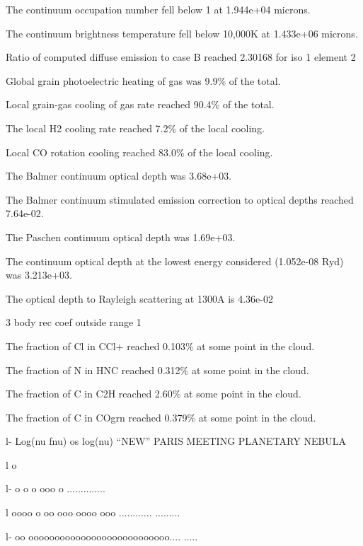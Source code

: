 {   The continuum occupation number fell below 1 at 1.944e+04 microns.

   The continuum brightness temperature fell below 10,000K at 1.433e+06
microns.

   Ratio of computed diffuse emission to case B reached 2.30168 for iso
1 element 2

   Global grain photoelectric heating of gas was  9.9\% of the total.

   Local grain-gas cooling of gas rate reached  90.4\% of the total.

   The local H2 cooling rate reached 7.2\% of the local cooling.

   Local CO rotation cooling reached 83.0\% of the local cooling.

   The Balmer continuum optical depth was  3.68e+03.

   The Balmer continuum stimulated emission correction to optical depths
reached  7.64e-02.

   The Paschen continuum optical depth was 1.69e+03.

   The continuum optical depth at the lowest energy considered (1.052e-08
Ryd) was  3.213e+03.

   The optical depth to Rayleigh scattering at 1300A is 4.36e-02

   3 body rec coef outside range 1

   The fraction of Cl in CCl+   reached 0.103\% at some point in the cloud.

   The fraction of N  in HNC    reached 0.312\% at some point in the cloud.

   The fraction of C  in C2H    reached 2.60\% at some point in the cloud.

   The fraction of C  in COgrn  reached 0.379\% at some point in the cloud.

 
    l-                      Log(nu fnu) os log(nu) ``NEW'' PARIS MEETING
PLANETARY NEBULA                                      

     l    o                                                            

     l-         o         o      o ooo   o                     ..............

     l           oooo  o     oo  ooo oooo  ooo     ............        
.........                                         

     l-   oo        ooooooooooooooooooooooooooo....                    
.....                                     

}
